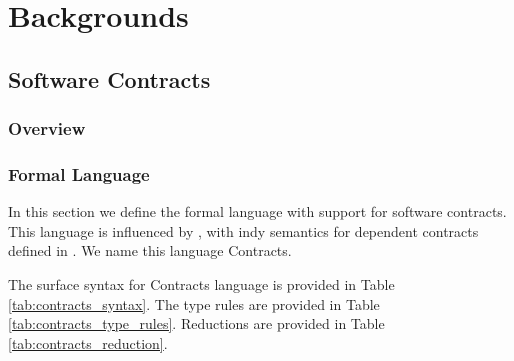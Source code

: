 \chapter{Backgrounds}

\section{Software Contracts}

\subsection{Overview}

\subsection{Formal Language}

In this section we define the formal language with support for software contracts. This language is influenced by \cite{cpcf}, with indy semantics for dependent contracts defined in \cite{completemonitors}. We name this language Contracts.

The surface syntax for Contracts language is provided in Table \ref{tab:contracts_syntax}. The type rules are provided in Table \ref{tab:contracts_type_rules}. Reductions are provided in Table \ref{tab:contracts_reduction}.

